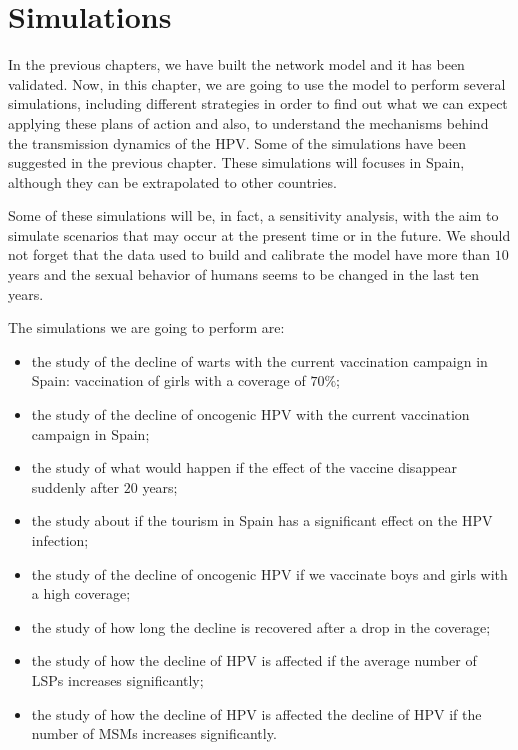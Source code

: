 \chapter{Simulations}\label{HPVSpain}
In the previous chapters, we have built the network model and it has been validated. Now, in this chapter, we are going to use the model to perform several simulations, including different strategies in order to find out what we can expect applying these plans of action and also, to understand the mechanisms behind the transmission dynamics of the HPV. Some of the simulations have been suggested in the previous chapter. These simulations will focuses in Spain, although they can be extrapolated to other countries. 

Some of these simulations will be, in fact, a sensitivity analysis, with the aim to simulate scenarios that may occur at the present time or in the future. We should not forget that the data used to build and calibrate the model have more than $10$ years and the sexual behavior of humans seems to be changed in the last ten years.

The simulations we are going to perform are:

\begin{itemize}
\item the study of the decline of warts with the current vaccination campaign in Spain: vaccination of girls with a coverage of $70\%$;
\item the study of the decline of oncogenic HPV with the current vaccination campaign in Spain;
\item the study of what would happen if the effect of the vaccine disappear suddenly after $20$ years;
\item the study about if the tourism in Spain has a significant effect on the HPV infection;
\item the study of the decline of oncogenic HPV if we vaccinate boys and girls with a high coverage;
\item the study of how long the decline is recovered after a drop in the coverage;
\item the study of how the decline of HPV is affected  if the average number of LSPs increases significantly;
\item the study of how the decline of HPV is affected the decline of HPV if the number of MSMs increases significantly.
\end{itemize}

